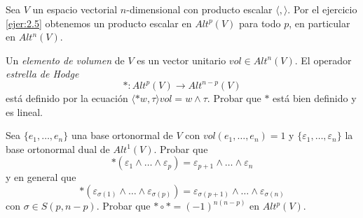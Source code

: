 \documentclass[twoside]{article}
\begin{document}
\begin{ejercicio}{2.9}
Sea $V$ un espacio vectorial $n$-dimensional con producto escalar $\langle,\rangle$. Por el ejercicio \ref{ejer:2.5} obtenemos un producto escalar en $Alt^p(V)$ para todo $p$, en particular en $Alt^n(V)$. 

Un \emph{elemento de volumen} de $V$ es un vector unitario $vol\in Alt^n(V)$. El operador \emph{estrella de Hodge}
\[
*: Alt^p(V)\to Alt^{n-p}(V)
\]  
está definido por la ecuación $\langle *w,\tau\rangle vol=w\land \tau$. Probar que $*$ está bien definido y es lineal.

Sea $\{e_1,\dots, e_n\}$ una base ortonormal de $V$ con $vol(e_1,\dots, e_n)=1$ y $\{\varepsilon_1,\dots, \varepsilon_n\}$ la base ortonormal dual de $Alt^1(V)$. Probar que 
\[
*(\varepsilon_1\land\dots\land\varepsilon_p)=\varepsilon_{p+1}\land\dots\land\varepsilon_n
\]
y en general que
\[
*(\varepsilon_{\sigma(1)}\land\dots\land\varepsilon_{\sigma(p)})=\varepsilon_{\sigma(p+1)}\land\dots\land\varepsilon_{\sigma(n)}
\]
con $\sigma\in S(p,n-p)$. Probar que $*\circ *=(-1)^{n(n-p)}$ en $Alt^p(V)$.
\end{ejercicio}
\end{document}
